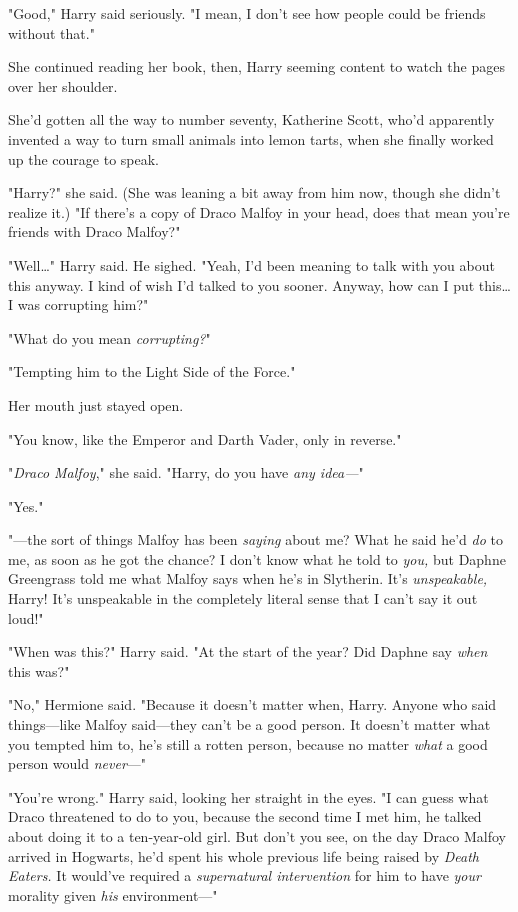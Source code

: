 "Good," Harry said seriously. "I mean, I don't see how people could be friends 
without that."

She continued reading her book, then, Harry seeming content to watch the pages 
over her shoulder.

She'd gotten all the way to number seventy, Katherine Scott, who'd apparently 
invented a way to turn small animals into lemon tarts, when she finally worked 
up the courage to speak.

"Harry?" she said. (She was leaning a bit away from him now, though she didn't 
realize it.) "If there's a copy of Draco Malfoy in your head, does that mean 
you're friends with Draco Malfoy?"

"Well{\ldots}" Harry said. He sighed. "Yeah, I'd been meaning to talk with you 
about this anyway. I kind of wish I'd talked to you sooner. Anyway, how can I 
put this{\ldots} I was corrupting him?"

"What do you mean \emph{corrupting?}"

"Tempting him to the Light Side of the Force."

Her mouth just stayed open.

"You know, like the Emperor and Darth Vader, only in reverse."

"\emph{Draco Malfoy}," she said. "Harry, do you have \emph{any idea---}"

"Yes."

"---the sort of things Malfoy has been \emph{saying} about me? What he said 
he'd \emph{do} to me, as soon as he got the chance? I don't know what he told 
to \emph{you,} but Daphne Greengrass told me what Malfoy says when he's in 
Slytherin. It's \emph{unspeakable,} Harry! It's unspeakable in the completely 
literal sense that I can't say it out loud!"

"When was this?" Harry said. "At the start of the year? Did Daphne say 
\emph{when} this was?"

"No," Hermione said. "Because it doesn't matter when, Harry. Anyone who said 
things---like Malfoy said---they can't be a good person. It doesn't matter what 
you tempted him to, he's still a rotten person, because no matter \emph{what} a 
good person would \emph{never}---"

"You're wrong." Harry said, looking her straight in the eyes. "I can guess what 
Draco threatened to do to you, because the second time I met him, he talked 
about doing it to a ten-year-old girl. But don't you see, on the day Draco 
Malfoy arrived in Hogwarts, he'd spent his whole previous life being raised by 
\emph{Death Eaters.} It would've required a \emph{supernatural intervention} 
for him to have \emph{your} morality given \emph{his} environment---"

